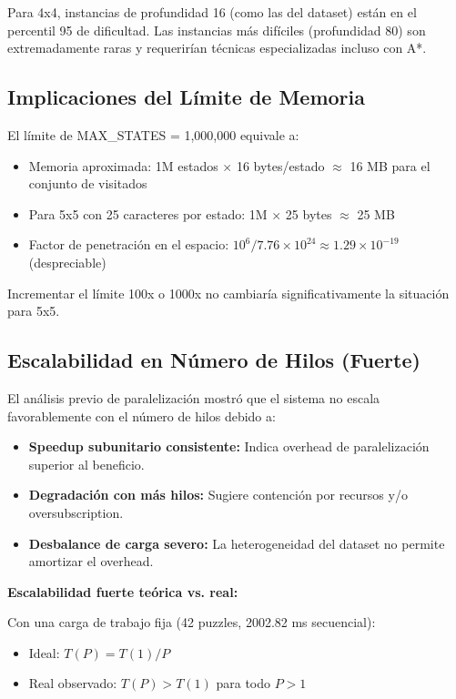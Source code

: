 \documentclass[12pt,a4paper]{article}
\begin{document}
Para 4x4, instancias de profundidad 16 (como las del dataset) están en el percentil 95 de dificultad. Las instancias más difíciles (profundidad 80) son extremadamente raras y requerirían técnicas especializadas incluso con A*.

\subsection{Implicaciones del Límite de Memoria}

El límite de MAX\_STATES = 1,000,000 equivale a:
\begin{itemize}
    \item Memoria aproximada: 1M estados $\times$ 16 bytes/estado $\approx$ 16 MB para el conjunto de visitados
    \item Para 5x5 con 25 caracteres por estado: 1M $\times$ 25 bytes $\approx$ 25 MB
    \item Factor de penetración en el espacio: $10^6 / 7.76 \times 10^{24} \approx 1.29 \times 10^{-19}$ (despreciable)
\end{itemize}

Incrementar el límite 100x o 1000x no cambiaría significativamente la situación para 5x5.

\subsection{Escalabilidad en Número de Hilos (Fuerte)}

El análisis previo de paralelización mostró que el sistema no escala favorablemente con el número de hilos debido a:

\begin{itemize}
    \item \textbf{Speedup subunitario consistente:} Indica overhead de paralelización superior al beneficio.
    \item \textbf{Degradación con más hilos:} Sugiere contención por recursos y/o oversubscription.
    \item \textbf{Desbalance de carga severo:} La heterogeneidad del dataset no permite amortizar el overhead.
\end{itemize}

\textbf{Escalabilidad fuerte teórica vs. real:}

Con una carga de trabajo fija (42 puzzles, 2002.82 ms secuencial):
\begin{itemize}
    \item Ideal: $T(P) = T(1)/P$
    \item Real observado: $T(P) > T(1)$ para todo $P > 1$
\end{itemize}
\end{document}
